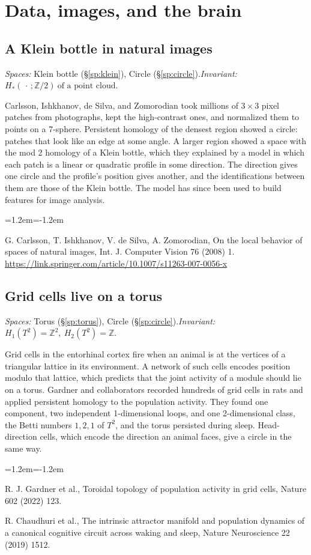 \documentclass[11pt,twoside]{book}
\begin{document}
\section{Data, images, and the brain}
\subsection{A Klein bottle in natural images}\label{app:app-klein}
\noindent\textit{Spaces:} Klein bottle (\S\ref{sp:klein}), Circle (\S\ref{sp:circle}).\enspace\textit{Invariant:} $H_*(\,\cdot\,;\mathbb{Z}/2)\ \text{of a point cloud}$.

Carlsson, Ishkhanov, de Silva, and Zomorodian took millions of $3\times3$ pixel patches from photographs, kept the high-contrast ones, and normalized them to points on a 7-sphere. Persistent homology of the densest region showed a circle: patches that look like an edge at some angle. A larger region showed a space with the mod 2 homology of a Klein bottle, which they explained by a model in which each patch is a linear or quadratic profile in some direction. The direction gives one circle and the profile's position gives another, and the identifications between them are those of the Klein bottle. The model has since been used to build features for image analysis.
\begin{list}{}{\leftmargin=1.2em\itemindent=-1.2em\itemsep=0pt}\small \item G. Carlsson, T. Ishkhanov, V. de Silva, A. Zomorodian, On the local behavior of spaces of natural images, Int. J. Computer Vision 76 (2008) 1. \url{https://link.springer.com/article/10.1007/s11263-007-0056-x}\end{list}
\subsection{Grid cells live on a torus}\label{app:app-grid}
\noindent\textit{Spaces:} Torus (\S\ref{sp:torus}), Circle (\S\ref{sp:circle}).\enspace\textit{Invariant:} $H_1(T^2)=\mathbb{Z}^2,\ H_2(T^2)=\mathbb{Z}$.

Grid cells in the entorhinal cortex fire when an animal is at the vertices of a triangular lattice in its environment. A network of such cells encodes position modulo that lattice, which predicts that the joint activity of a module should lie on a torus. Gardner and collaborators recorded hundreds of grid cells in rats and applied persistent homology to the population activity. They found one component, two independent 1-dimensional loops, and one 2-dimensional class, the Betti numbers $1,2,1$ of $T^2$, and the torus persisted during sleep. Head-direction cells, which encode the direction an animal faces, give a circle in the same way.
\begin{list}{}{\leftmargin=1.2em\itemindent=-1.2em\itemsep=0pt}\small \item R. J. Gardner et al., Toroidal topology of population activity in grid cells, Nature 602 (2022) 123.\item R. Chaudhuri et al., The intrinsic attractor manifold and population dynamics of a canonical cognitive circuit across waking and sleep, Nature Neuroscience 22 (2019) 1512.\end{list}
\end{document}
